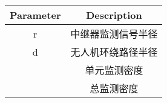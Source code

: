 ﻿\documentclass{ctexart}
\begin{document}
	\begin{tabular}{cc}
	\hline
	Parameter & Description \\
	\hline
	r & 中继器监测信号半径 \\
	d & 无人机环绕路径半径 \\
	\rho & 单元监测密度 \\
	\varOmega & 总监测密度 \\
	\hline
	\end{tabular}
\end{document}
